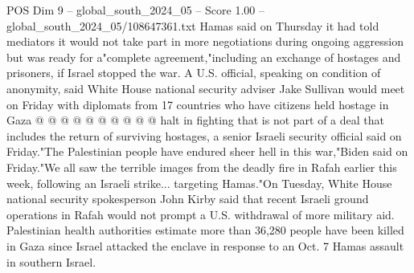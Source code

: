 \begin{textsample}{POS Dim 9 – global\_south\_2024\_05 – Score 1.00 – global\_south\_2024\_05/108647361.txt}
Hamas said on Thursday it had told mediators it would not take part in more negotiations during ongoing aggression but was ready for a"complete agreement,"including an exchange of hostages and prisoners, if Israel stopped the war.
A U.S. official, speaking on condition of anonymity, said White House national security adviser Jake Sullivan would meet on Friday with diplomats from 17 countries who have citizens held hostage in Gaza @ @ @ @ @ @ @ @ @ @ halt in fighting that is not part of a deal that includes the return of surviving hostages, a senior Israeli security official said on Friday."The Palestinian people have endured sheer hell in this war,"Biden said on Friday."We all saw the terrible images from the deadly fire in Rafah earlier this week, following an Israeli strike... targeting Hamas."On Tuesday, White House national security spokesperson John Kirby said that recent Israeli ground operations in Rafah would not prompt a U.S. withdrawal of more military aid.
Palestinian health authorities estimate more than 36,280 people have been killed in Gaza since Israel attacked the enclave in response to an Oct. 7 Hamas assault in southern Israel.

\end{textsample}
